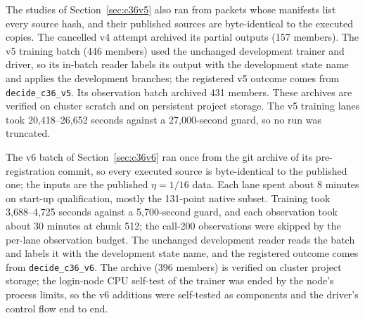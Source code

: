 \documentclass[11pt]{article}
\begin{document}
The studies of Section~\ref{sec:c36v5} also ran from packets whose
manifests list every source hash, and their published sources are
byte-identical to the executed copies. The cancelled v4 attempt archived its
partial outputs (157 members). The v5 training batch (446 members) used the
unchanged development trainer and driver, so its in-batch reader labels its
output with the development state name and applies the development
branches; the registered v5 outcome comes from \texttt{decide\_c36\_v5}.
Its observation batch archived 431 members. These archives are verified on
cluster scratch and on persistent project storage. The v5 training lanes took 20,418--26,652 seconds against a
27,000-second guard, so no run was truncated.

The v6 batch of Section~\ref{sec:c36v6} ran once from the git archive of its
pre-registration commit, so every executed source is byte-identical to the
published one; the inputs are the published $\eta=1/16$ data. Each lane
spent about 8 minutes on start-up qualification, mostly the 131-point
native subset. Training took 3,688--4,725 seconds against a 5,700-second
guard, and each observation took about 30 minutes at chunk 512; the
call-200 observations were skipped by the per-lane observation budget. The
unchanged development reader reads the batch and labels it with the
development state name, and the registered outcome comes from
\texttt{decide\_c36\_v6}. The archive (396 members) is verified on
cluster project storage; the login-node CPU self-test of the trainer was
ended by the node's process limits, so the v6 additions were self-tested
as components and the driver's control flow end to end.
\end{document}
